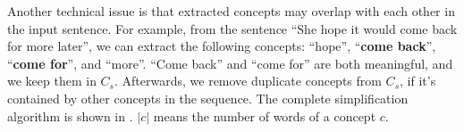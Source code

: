 Another technical issue is that extracted concepts may overlap with 
each other in the input sentence. For example, from the sentence 
``She hope it would come back for more later'', we can extract the following
concepts: ``hope'', ``\textbf{come back}'', ``\textbf{come for}'', 
and ``more''. ``Come back'' and ``come for'' are both meaningful, and we keep 
them in $C_s$.
Afterwards, we remove duplicate concepts from $C_s$,
if it's contained by other concepts in the sequence.
The complete simplification
algorithm is shown in . $|c|$ means the number of words
of a concept $c$.





